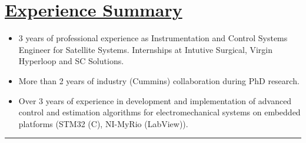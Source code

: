 \section*{\underline{Experience Summary}}
\begin{itemize}
        \item 3 years of professional experience as Instrumentation and Control Systems Engineer for Satellite Systems. Internships at Intutive Surgical, Virgin Hyperloop and SC Solutions.
        \item More than 2 years of industry (Cummins) collaboration during PhD research.
        \item Over 3 years of experience in development and implementation  of advanced control and estimation algorithms for electromechanical systems on embedded platforms (STM32 (C), NI-MyRio (LabView)).
\end{itemize}

\noindent\rule{\textwidth}{0.4pt}
